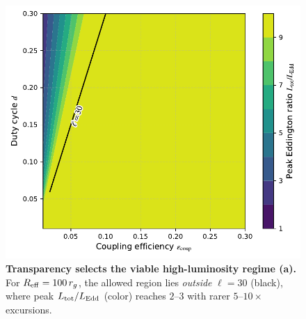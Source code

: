 \documentclass[twocolumn]{aastex701}
\begin{document}
\begingroup
\setlength{\textfloatsep}{6pt plus 2pt minus 2pt} %
\begin{figure}[tp!]
  \centering
  \includegraphics[width=0.95\columnwidth,trim=0 6 0 4,clip]{fig10a_Reff100.pdf}
  \vspace{-2pt}
  \caption{\textbf{Transparency selects the viable high-luminosity regime (a).}
  For $R_{\rm eff}=100\,r_g$, the allowed region lies \emph{outside} $\ell{=}30$ (black), where peak $L_{\rm tot}/L_{\rm Edd}$ (color) reaches $2$--$3$ with rarer $5$--$10\times$ excursions.}
  \label{fig:param-a}
\end{figure}
\endgroup
\end{document}
